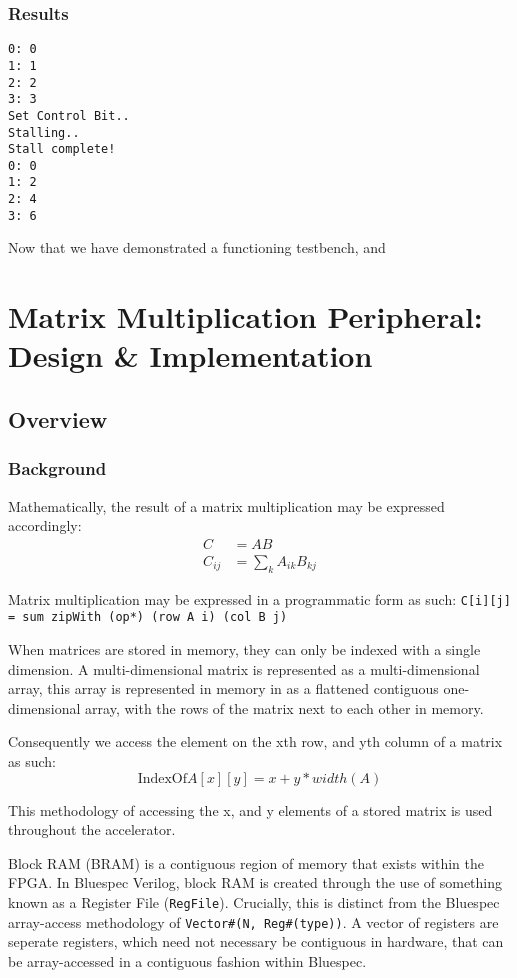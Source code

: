 \documentclass[a4paper,8pt]{report}
\begin{document}
\subsection{Results}
\begin{verbatim}
0: 0
1: 1
2: 2
3: 3
Set Control Bit..
Stalling..
Stall complete!
0: 0
1: 2
2: 4
3: 6
\end{verbatim}

Now that we have demonstrated a functioning testbench, and 

\chapter{Matrix Multiplication Peripheral: Design \& Implementation}
\section{Overview}
\subsection{Background}
Mathematically, the result of a matrix multiplication may be expressed
accordingly:
\begin{align*}
  C &= AB \\
  C_{ij} &= \sum_k A_{ik}B_{kj}
\end{align*}

Matrix multiplication may be expressed in a programmatic form as such:
\texttt{C[i][j] = sum zipWith (op*) (row A i) (col B j)}

When matrices are stored in memory, they can only be indexed with a single
dimension. A multi-dimensional matrix is represented as a multi-dimensional
array, this array is represented in memory in as a flattened contiguous
one-dimensional array, with the rows of the matrix next to each other in memory.

Consequently we access the element on the xth row, and yth column of a matrix as
such:
$$ \text{IndexOf} A[x][y] = x + y * width(A) $$

This methodology of accessing the x, and y elements of a stored matrix is used
throughout the accelerator.

Block RAM (BRAM) is a contiguous region of memory that exists within the FPGA. In
Bluespec Verilog, block RAM is created through the use of something known as a
Register File (\texttt{RegFile}). Crucially, this is distinct from the Bluespec
array-access methodology of \texttt{Vector\#(N, Reg\#(type))}. A vector of
registers are seperate registers, which need not necessary be contiguous in
hardware, that can be array-accessed in a contiguous fashion within Bluespec.
\end{document}
